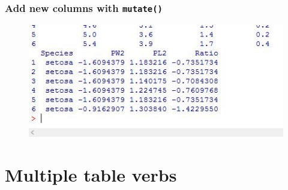 \documentclass{beamer}
\begin{document}
\begin{frame}
	
	\frametitle{Add new columns with \texttt{mutate()} }
	\begin{figure}
		\centering
		\includegraphics[width=0.9\linewidth]{images/irismutate2}
		
	\end{figure}
	
\end{frame}

\section{Multiple table verbs}
\end{document}
